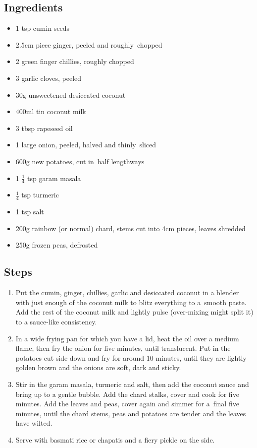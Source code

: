 \documentclass{book}
\begin{document}
\subsection*{Ingredients}
\begin{itemize}
\item 1 tsp cumin seeds
\item 2.5cm piece ginger, peeled and roughly chopped 
\item 2 green finger chillies, roughly chopped
\item 3 garlic cloves, peeled 
\item 30g unsweetened desiccated coconut 
\item 400ml tin coconut milk 
\item 3 tbsp rapeseed oil 
\item 1 large onion, peeled, halved and thinly sliced 
\item 600g new potatoes, cut in half lengthways 
\item 1 $\frac{1}{4}$ tsp garam masala
\item $\frac{1}{4}$ tsp turmeric
\item 1 tsp salt
\item 200g rainbow (or normal) chard, stems cut into 4cm pieces, leaves shredded
\item 250g frozen peas, defrosted 
\end{itemize}

\subsection*{Steps}
\begin{enumerate}
\item Put the cumin, ginger, chillies, garlic and desiccated coconut in a blender with just enough of the coconut milk to blitz everything to a smooth paste. Add the rest of the coconut milk and lightly pulse (over-mixing might split it) to a sauce-like consistency.
\item In a wide frying pan for which you have a lid, heat the oil over a medium flame, then fry the onion for five minutes, until translucent. Put in the potatoes cut side down and fry for around 10 minutes, until they are lightly golden brown and the onions are soft, dark and sticky.
\item Stir in the garam masala, turmeric and salt, then add the coconut sauce and bring up to a gentle bubble. Add the chard stalks, cover and cook for five minutes. Add the leaves and peas, cover again and simmer for a final five minutes, until the chard stems, peas and potatoes are tender and the leaves have wilted.
\item Serve with basmati rice or chapatis and a fiery pickle on the side.
\end{enumerate}
\newpage
\end{document}
